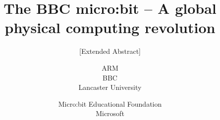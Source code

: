 \documentclass{research4cacm}
\begin{document}
%

\title{The BBC micro:bit -- A global physical computing revolution
%
}
\subtitle{[Extended Abstract]
}
%
%
%
%
%
%
\author{
%
%
\alignauthor ARM \\
\alignauthor BBC \\
\alignauthor Lancaster University \\
\and
\alignauthor Micro:bit Educational Foundation \\
\alignauthor Microsoft \\
}
\end{document}
